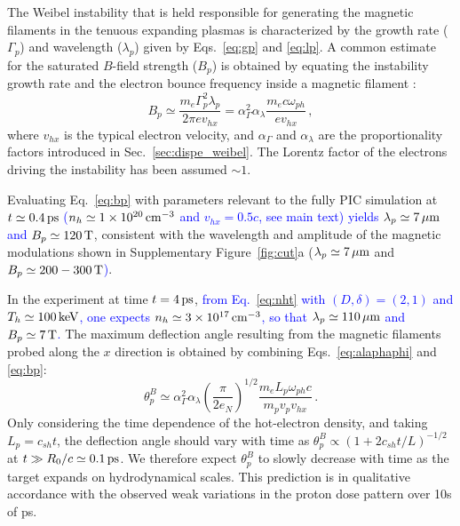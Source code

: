 \documentclass[aps,superscriptaddress]{revtex4}
\begin{document}
The Weibel instability that is held responsible for generating the magnetic filaments in the tenuous expanding plasmas is characterized by the growth rate ($\Gamma_p$) and wavelength ($\lambda_p$) given by Eqs.~\eqref{eq:gp} and \eqref{eq:lp}. A common estimate for the saturated $B$-field strength ($B_p$) is obtained by equating the instability growth rate and the electron bounce frequency inside a magnetic filament \cite{POF_Davidson_1972}:
\begin{equation}\label{eq:bp}
B_p \simeq \frac{m_e \Gamma_p^2 \lambda_p}{2\pi e v_{hx}} = \alpha_\Gamma^2 \alpha_\lambda \frac{m_e c\omega_{ph}}{e v_{hx}} \,,
\end{equation}
where $v_{hx}$ is the typical electron velocity, and $\alpha_\Gamma$ and $\alpha_\lambda$ are the proportionality factors introduced in Sec.~\ref{sec:dispe_weibel}. The Lorentz factor of the electrons driving the instability has been assumed $\sim 1$.

Evaluating Eq.~\eqref{eq:bp} with parameters relevant to the fully PIC simulation at \textcolor{blue}{$t\simeq 0.4\,\rm ps$ ($n_h \simeq 1\times 10^{20}\,\rm cm^{-3}$ and $v_{hx} = 0.5c$, see main text) yields $\lambda_p \simeq 7 \,\rm \mu m$ and $B_p \simeq 120\,\rm T$}, consistent with the wavelength and amplitude of the magnetic modulations shown in Supplementary Figure~\ref{fig:cut}a ($\lambda_p \simeq 7 \,\rm \mu m$  and \textcolor{blue}{$B_p \simeq 200-300\,\rm T$)}.

In the experiment at time $t=4\,\rm ps$, 
\textcolor{blue}{from Eq.~\eqref{eq:nht} with $(D,\delta)=(2,1)$ and $T_h\simeq 100\,\rm keV$, one expects $n_h \simeq 3\times 10^{17}\,\rm cm^{-3}$, so that $\lambda_p \simeq 110\,\rm \mu m$ and $B_p \simeq 7\,\rm T$.}
The maximum deflection angle resulting from the magnetic filaments probed along the $x$ direction is obtained by combining Eqs.~\eqref{eq:alaphaphi} and \eqref{eq:bp}:
\begin{equation} \label{eq:alaphap}
\theta_p^B \simeq \alpha_\Gamma^2 \alpha_\lambda \left(\frac{\pi}{2e_N} \right)^{1/2} \frac{m_e L_p \omega_{ph} c}{m_p v_p v_{hx}} \,. 
\end{equation}
Only considering the time dependence of the hot-electron density, and taking $L_p = c_{sh}t$, the deflection angle should vary with time as $\theta_p^B \propto (1+2c_{sh}t/L)^{-1/2}$ at $t \gg R_0/c \simeq 0.1\,\rm ps$. We therefore expect $\theta_p^B$ to slowly decrease with time as the target expands on hydrodynamical scales. This prediction is in qualitative accordance with the observed weak variations in the proton dose pattern over 10s of ps.
\end{document}
